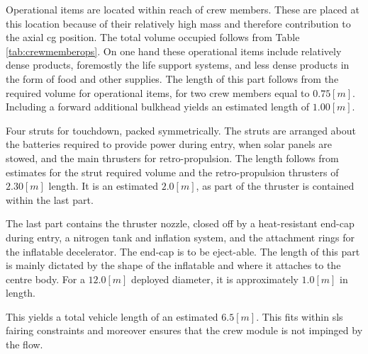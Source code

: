 Operational items are located within reach of crew members. These are placed at this location because of their relatively high mass and therefore contribution to the axial \gls{cg} position. The total volume occupied follows from Table \ref{tab:crewmemberops}. On one hand these operational items include relatively dense products, foremostly the life support systems, and less dense products in the form of food and other supplies.  The length of this part follows from the required volume for operational items, for two crew members equal to $0.75 \left[m\right]$. Including a forward additional bulkhead yields an estimated length of $1.00 \left[m\right]$.


Four struts for touchdown, packed symmetrically. The struts are arranged about the batteries required to provide power during entry, when solar panels are stowed, and the main thrusters for retro-propulsion. The length follows from estimates for the strut required volume and the retro-propulsion thrusters of $2.30 \left[m\right]$ length. It is an estimated $2.0 \left[m\right]$, as part of the thruster is contained within the last part.

The last part contains the thruster nozzle, closed off by a heat-resistant end-cap during entry, a nitrogen tank and inflation system, and the attachment rings for the inflatable decelerator. The end-cap is to be eject-able. The length of this part is mainly dictated by the shape of the inflatable and where it attaches to the centre body. For a $12.0 \left[m\right]$ deployed diameter, it is approximately $1.0 \left[m\right]$ in length.

This yields a total vehicle length of an estimated $6.5 \left[m\right]$. This fits within \gls{sls} fairing constraints  and moreover ensures that the crew module is not impinged by the flow.

